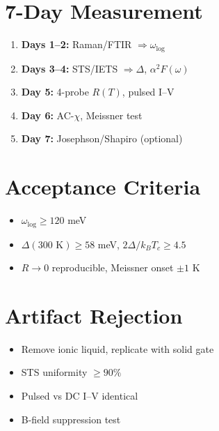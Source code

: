 \documentclass[12pt]{article}
\begin{document}
\section*{7-Day Measurement}
\begin{enumerate}
  \item \textbf{Days 1--2:} Raman/FTIR $\Rightarrow \omega_{\log}$
  \item \textbf{Days 3--4:} STS/IETS $\Rightarrow \Delta$, $\alpha^2F(\omega)$
  \item \textbf{Day 5:} 4-probe $R(T)$, pulsed I--V
  \item \textbf{Day 6:} AC-$\chi$, Meissner test
  \item \textbf{Day 7:} Josephson/Shapiro (optional)
\end{enumerate}

\section*{Acceptance Criteria}
\begin{itemize}
  \item $\omega_{\log}\ge120$ meV
  \item $\Delta(300\text{ K})\ge58$ meV, $2\Delta/k_BT_c\ge4.5$
  \item $R\to0$ reproducible, Meissner onset $\pm1$ K
\end{itemize}

\section*{Artifact Rejection}
\begin{itemize}
  \item Remove ionic liquid, replicate with solid gate
  \item STS uniformity $\ge90\%$
  \item Pulsed vs DC I--V identical
  \item B-field suppression test
\end{itemize}
\end{document}
